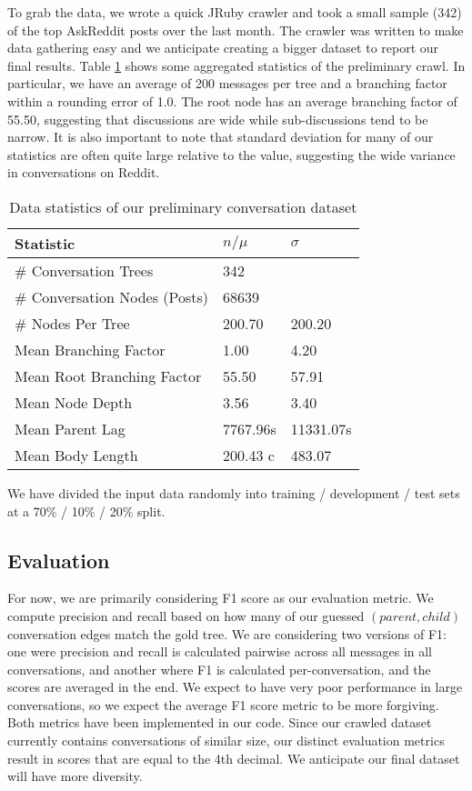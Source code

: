 \documentclass[10pt]{article}
\begin{document}
To grab the data, we wrote a quick JRuby crawler and took a small sample (342) of the top
AskReddit posts over the last month. The crawler was written to make data gathering easy
and we anticipate creating a bigger dataset to report our final results. Table \ref{table:stats}
shows some aggregated statistics of the preliminary crawl. In particular, we have an average
of 200 messages per tree and a branching factor within a rounding error of 1.0. The root
node has an average branching factor of 55.50, suggesting that discussions are wide while
sub-discussions tend to be narrow. It is also important to note that standard
deviation for many of our statistics are often quite large relative to the
value, suggesting the wide variance in conversations on Reddit.

\begin{table}[h]\footnotesize
 \begin{tabular}{| l | l | l |} 
   \hline
   \textbf{Statistic} & \textbf{$n / \mu$} & \textbf{$\sigma$} \\
   \hline
    \# Conversation Trees &  342 & \\
    \# Conversation Nodes (Posts) & 68639 & \\
    \# Nodes Per Tree &  200.70 & 200.20 \\
    Mean Branching Factor & 1.00 & 4.20 \\
    Mean Root Branching Factor &  55.50 & 57.91 \\
    Mean Node Depth  & 3.56 & 3.40 \\
    Mean Parent Lag & 7767.96s & 11331.07s \\
    Mean Body Length & 200.43 c & 483.07 \\
   \hline
  \end{tabular}
  \caption{Data statistics of our preliminary conversation dataset}
  \label{table:stats}
\end{table}

We have divided the input data randomly into training / development / test sets
at a 70\% / 10\% / 20\% split.

\subsection{Evaluation}
For now, we are primarily considering F1 score as our evaluation metric. We
compute precision and recall based on how many of our guessed $(parent,child)$
conversation edges match the gold tree. We are considering two
versions of F1: one were precision and recall is calculated pairwise across all
messages in all conversations, and another where F1 is calculated
per-conversation, and the scores are averaged in the end. We expect to have
very poor performance in large conversations, so we expect the average F1 score metric to be
more forgiving. Both metrics have been implemented in our code. Since our 
crawled dataset currently contains conversations of similar size, our
distinct evaluation metrics result in scores that are equal to the 4th decimal. We
anticipate our final dataset will have more diversity.
\end{document}
